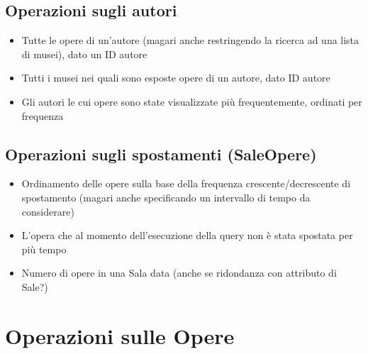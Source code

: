 \documentclass[a4paper,11pt]{article}
\begin{document}
\subsection{Operazioni sugli autori}
\begin{itemize}
	\item Tutte le opere di un'autore (magari anche restringendo la ricerca ad una lista di musei), dato un ID autore
	\item Tutti i musei nei quali sono esposte opere di un autore, dato ID autore
	\item Gli autori le cui opere sono state visualizzate più frequentemente, ordinati per frequenza
\end{itemize}
\subsection{Operazioni sugli spostamenti (SaleOpere)}
\begin{itemize}
	\item Ordinamento delle opere sulla base della frequenza crescente/decrescente di spostamento (magari anche specificando un intervallo di tempo da considerare)
	\item L'opera che al momento dell'esecuzione della query non è stata spostata per più tempo
	\item Numero di opere in una Sala data (anche se ridondanza con attributo di Sale?)
\end{itemize}

\section{Operazioni sulle Opere}

\end{document}
